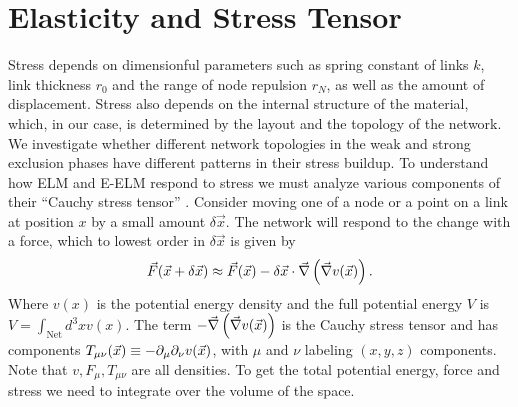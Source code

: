 \documentclass[nofootinbib,preprint,floatfix,endfloats]{revtex4} %
\begin{document}
\section{Elasticity and Stress Tensor}
Stress depends on dimensionful parameters such as spring constant of links $k$, link thickness $r_0$ and the range of node repulsion $r_N$, as well as the amount of displacement. 
Stress also depends on the internal structure of the material, which, in our case, is determined by the layout and the topology of the network. 
We investigate whether different network topologies in the weak and strong exclusion phases have different patterns in their stress buildup. 
To understand how ELM and E-ELM respond to stress we must analyze various components of their ``Cauchy stress tensor'' \cite{irgens2008continuum}. 
Consider moving one of a node or a point on a link at position $x$ by a small amount $\delta \vec{x}$.
The network will respond to the change with a force, which to lowest order in $\delta \vec{x}$ is given by
\begin{equation}
\vec{F} (\vec{x}+\delta \vec{x}) \approx %
\vec{F} (\vec{x})-\delta \vec{x}\cdot  \vec{\del} \pr{\vec{\del} v (\vec{x})}.\label{eq:dF}    
\end{equation}
Where $v(x)$ is the potential energy density and the full potential energy $V$ is $V = \int_\mathrm{Net} d^3x v(x)$. 
The term $-\vec{\nabla} \left(\vec{\nabla} v (\vec{x})\right)$ is the Cauchy stress tensor and has components $T_{\mu\nu}(\vec{x}) \equiv -\partial_\mu\partial_\nu v(\vec{x})$, with $\mu$ and $\nu$ labeling $(x,y,z)$ components. 
Note that $v,F_\mu,T_{\mu\nu}$ are all densities. 
To get the total potential energy, force and stress we need to integrate over the volume of the space. 
\end{document}
